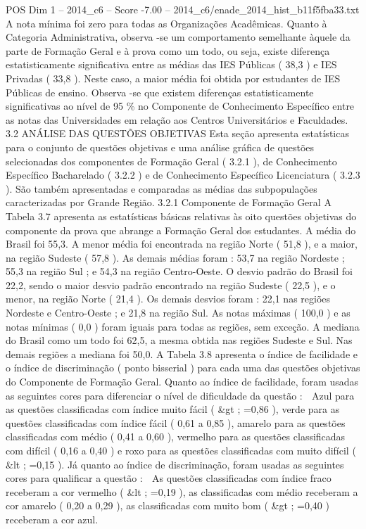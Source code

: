\begin{textsample}{POS Dim 1 – 2014\_c6 – Score -7.00 – 2014\_c6/enade\_2014\_hist\_b11f5fba33.txt}
A nota mínima foi zero para todas as Organizações Acadêmicas.
Quanto à Categoria Administrativa, observa -se um comportamento semelhante àquele da parte de Formação Geral e à prova como um todo, ou seja, existe diferença estatisticamente significativa entre as médias das IES Públicas ( 38,3 ) e IES Privadas ( 33,8 ).
Neste caso, a maior média foi obtida por estudantes de IES Públicas de ensino.
Observa -se que existem diferenças estatisticamente significativas ao nível de 95 \% no Componente de Conhecimento Específico entre as notas das Universidades em relação aos Centros Universitários e Faculdades. 3.2 ANÁLISE DAS QUESTÕES OBJETIVAS Esta seção apresenta estatísticas para o conjunto de questões objetivas e uma análise gráfica de questões selecionadas dos componentes de Formação Geral ( 3.2.1 ), de Conhecimento Específico Bacharelado ( 3.2.2 ) e de Conhecimento Específico Licenciatura ( 3.2.3 ).
São também apresentadas e comparadas as médias das subpopulações caracterizadas por Grande Região. 3.2.1 Componente de Formação Geral A Tabela 3.7 apresenta as estatísticas básicas relativas às oito questões objetivas do componente da prova que abrange a Formação Geral dos estudantes.
A média do Brasil foi 55,3.
A menor média foi encontrada na região Norte ( 51,8 ), e a maior, na região Sudeste ( 57,8 ).
As demais médias foram : 53,7 na região Nordeste ; 55,3 na região Sul ; e 54,3 na região Centro-Oeste.
O desvio padrão do Brasil foi 22,2, sendo o maior desvio padrão encontrado na região Sudeste ( 22,5 ), e o menor, na região Norte ( 21,4 ).
Os demais desvios foram : 22,1 nas regiões Nordeste e Centro-Oeste ; e 21,8 na região Sul.
As notas máximas ( 100,0 ) e as notas mínimas ( 0,0 ) foram iguais para todas as regiões, sem exceção.
A mediana do Brasil como um todo foi 62,5, a mesma obtida nas regiões Sudeste e Sul.
Nas demais regiões a mediana foi 50,0.
A Tabela 3.8 apresenta o índice de facilidade e o índice de discriminação ( ponto bisserial ) para cada uma das questões objetivas do Componente de Formação Geral.
Quanto ao índice de facilidade, foram usadas as seguintes cores para diferenciar o nível de dificuldade da questão :  Azul para as questões classificadas com índice muito fácil ( \&gt ; =0,86 ), verde para as questões classificadas com índice fácil ( 0,61 a 0,85 ), amarelo para as questões classificadas com médio ( 0,41 a 0,60 ), vermelho para as questões classificadas com difícil ( 0,16 a 0,40 ) e roxo para as questões classificadas com muito difícil ( \&lt ; =0,15 ).
Já quanto ao índice de discriminação, foram usadas as seguintes cores para qualificar a questão :  As questões classificadas com índice fraco receberam a cor vermelho ( \&lt ; =0,19 ), as classificadas com médio receberam a cor amarelo ( 0,20 a 0,29 ), as classificadas com muito bom ( \&gt ; =0,40 ) receberam a cor azul.

\end{textsample}
